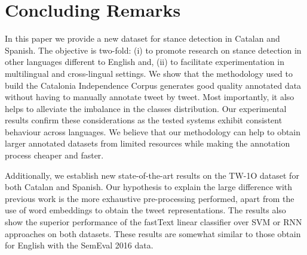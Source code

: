 \documentclass[10pt, a4paper]{article}
\begin{document}



\section{Concluding Remarks}\label{sec:concluding-remarks}

In this paper we provide a new dataset for stance detection in Catalan and Spanish. The objective is two-fold: (i) to promote research on stance detection in other languages different to English and, (ii) to facilitate experimentation in multilingual and cross-lingual settings. We show that the methodology used to build the Catalonia Independence Corpus generates good quality annotated data without having to manually annotate tweet by tweet. Most importantly, it also helps to alleviate the imbalance in the classes distribution. Our experimental results confirm these considerations as the tested systems exhibit consistent behaviour across languages. We believe that our methodology can help to obtain larger annotated datasets from limited resources while making the annotation process cheaper and faster.

Additionally, we establish new state-of-the-art results on the TW-1O dataset for both Catalan and Spanish. Our hypothesis to explain the large difference with previous work is the more exhaustive pre-processing performed, apart from the use of word embeddings to obtain the tweet representations. The results also show the superior performance of the fastText linear classifier over SVM or RNN approaches on both datasets. These results are somewhat similar to those obtain for English with the SemEval 2016 data.
\end{document}
